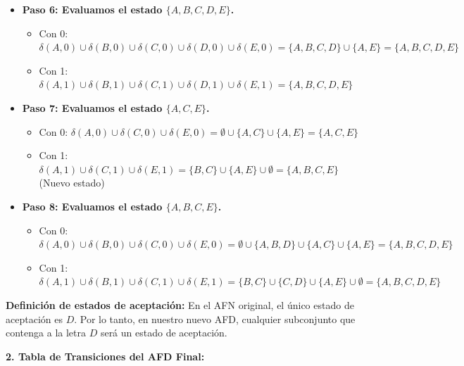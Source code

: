 \documentclass[12pt]{article}
\begin{document}
\begin{itemize}
    \item \textbf{Paso 6: Evaluamos el estado $\{A, B, C, D, E\}$.}
    \begin{itemize}
        \item Con 0: $\delta(A, 0) \cup \delta(B, 0) \cup \delta(C, 0) \cup \delta(D, 0) \cup \delta(E, 0) = \{A, B, C, D\} \cup \{A, E\} = \{A, B, C, D, E\}$
        \item Con 1: $\delta(A, 1) \cup \delta(B, 1) \cup \delta(C, 1) \cup \delta(D, 1) \cup \delta(E, 1) = \{A, B, C, D, E\}$
    \end{itemize}

    \item \textbf{Paso 7: Evaluamos el estado $\{A, C, E\}$.}
    \begin{itemize}
        \item Con 0: $\delta(A, 0) \cup \delta(C, 0) \cup \delta(E, 0) = \emptyset \cup \{A, C\} \cup \{A, E\} = \{A, C, E\}$
        \item Con 1: $\delta(A, 1) \cup \delta(C, 1) \cup \delta(E, 1) = \{B, C\} \cup \{A, E\} \cup \emptyset = \{A, B, C, E\}$ (Nuevo estado)
    \end{itemize}

    \item \textbf{Paso 8: Evaluamos el estado $\{A, B, C, E\}$.}
    \begin{itemize}
        \item Con 0: $\delta(A, 0) \cup \delta(B, 0) \cup \delta(C, 0) \cup \delta(E, 0) = \emptyset \cup \{A, B, D\} \cup \{A, C\} \cup \{A, E\} = \{A, B, C, D, E\}$
        \item Con 1: $\delta(A, 1) \cup \delta(B, 1) \cup \delta(C, 1) \cup \delta(E, 1) = \{B, C\} \cup \{C, D\} \cup \{A, E\} \cup \emptyset = \{A, B, C, D, E\}$
    \end{itemize}
\end{itemize}

\textbf{Definición de estados de aceptación:} En el AFN original, el único estado de aceptación es $D$. Por lo tanto, en nuestro nuevo AFD, cualquier subconjunto que contenga a la letra $D$ será un estado de aceptación.

\vspace{0.5cm}

\textbf{2. Tabla de Transiciones del AFD Final:}
\end{document}
